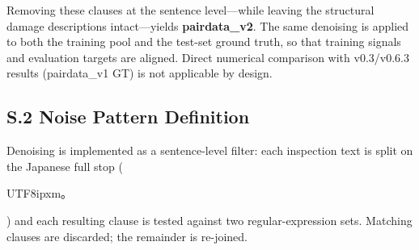 ﻿\documentclass[onecolumn]{article}
\begin{document}
\noindent
Removing these clauses at the sentence level---while leaving the structural
damage descriptions intact---yields \textbf{pairdata\_v2}.
The same denoising is applied to both the training pool and the test-set
ground truth, so that training signals and evaluation targets are aligned.
Direct numerical comparison with v0.3/v0.6.3 results (pairdata\_v1 GT) is
not applicable by design.

\subsection*{S.2 Noise Pattern Definition}

Denoising is implemented as a sentence-level filter:
each inspection text is split on the Japanese full stop (\begin{CJK}{UTF8}{ipxm}。\end{CJK}) and each
resulting clause is tested against two regular-expression sets.
Matching clauses are discarded; the remainder is re-joined.
\end{document}
